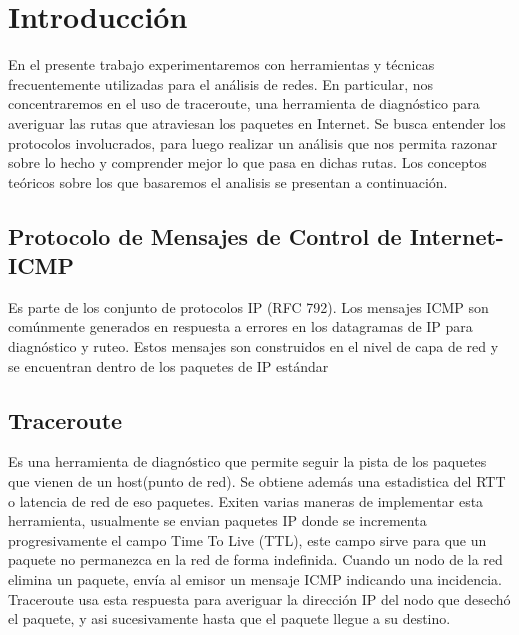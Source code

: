 \section{Introducción}

En el presente trabajo experimentaremos con herramientas y técnicas frecuentemente utilizadas para el análisis de redes. En particular, nos concentraremos en el uso de traceroute, una herramienta de diagnóstico para averiguar las rutas que atraviesan los paquetes en Internet.
Se busca entender los protocolos involucrados, para luego realizar un análisis que nos permita razonar sobre lo hecho y comprender mejor lo que pasa en dichas rutas. Los conceptos teóricos sobre los que basaremos el analisis se presentan a continuación.

\subsection{Protocolo de Mensajes de Control de Internet- ICMP}
Es parte de los conjunto de protocolos IP (RFC 792). Los mensajes ICMP son comúnmente generados en respuesta a errores en los datagramas de IP para diagnóstico y ruteo. Estos mensajes son construidos en el nivel de capa de red y se encuentran dentro de los paquetes de IP estándar

\subsection{Traceroute}

Es una herramienta de diagnóstico que permite seguir la pista de los paquetes que vienen de un host(punto de red). Se obtiene además una estadistica del RTT o latencia de red de eso paquetes.
Exiten varias maneras de implementar esta herramienta, usualmente se envian paquetes IP donde se incrementa progresivamente el campo Time To Live (TTL), este campo sirve para que un paquete no permanezca en la red de forma indefinida. Cuando un nodo de la red elimina un paquete, envía al emisor un mensaje ICMP indicando una incidencia. Traceroute usa esta respuesta para averiguar la dirección IP del nodo que desechó el paquete, y asi sucesivamente hasta que el paquete llegue a su destino.
